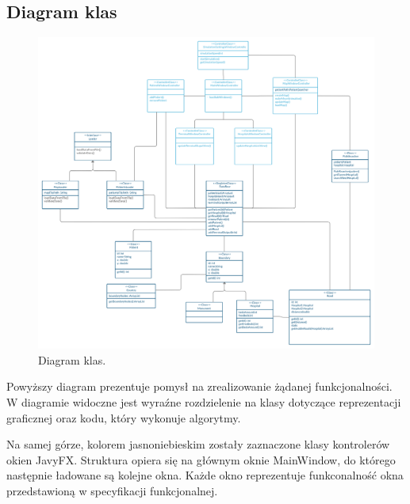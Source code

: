\documentclass[10pt,a4paper]{article}
\begin{document}
\subsection{Diagram klas}

\begin{figure}[h]
  \includegraphics[width=\linewidth]{./images/diagram_klas.png}
  \caption{Diagram klas.}
  \label{fig:diagram_klas}
\end{figure}

Powyższy diagram prezentuje pomysł na zrealizowanie żądanej funkcjonalności.
W diagramie widoczne jest wyraźne rozdzielenie na klasy dotyczące reprezentacji graficznej oraz kodu, który wykonuje algorytmy.

Na samej górze, kolorem jasnoniebieskim zostały zaznaczone klasy kontrolerów okien JavyFX. Struktura opiera się na głównym oknie MainWindow, do którego następnie ładowane są kolejne okna.
Każde okno reprezentuje funkconalność okna przedstawioną w specyfikacji funkcjonalnej.
\end{document}
